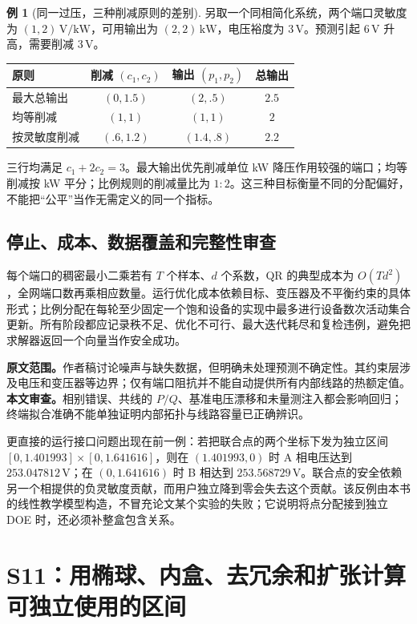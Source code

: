 \documentclass[UTF8,11pt,fontset=fandol,openany,oneside]{ctexbook}
\theoremstyle{definition}
\newtheorem{example}[theorem]{例}
\theoremstyle{remark}
\numberwithin{equation}{chapter}
\begin{document}
\begin{example}[同一过压，三种削减原则的差别]
另取一个同相简化系统，两个端口灵敏度为 $(1,2)\,\mathrm{V/kW}$，可用输出为 $(2,2)\,\mathrm{kW}$，电压裕度为 $3\,\mathrm V$。预测引起 $6\,\mathrm V$ 升高，需要削减 $3\,\mathrm V$。
\begin{center}
\begin{tabular}{@{}lccc@{}}
\toprule
原则 & 削减 $(c_1,c_2)$ & 输出 $(p_1,p_2)$ & 总输出 \\
\midrule
最大总输出 & $(0,1.5)$ & $(2,.5)$ & $2.5$ \\
均等削减 & $(1,1)$ & $(1,1)$ & $2$ \\
按灵敏度削减 & $(.6,1.2)$ & $(1.4,.8)$ & $2.2$ \\
\bottomrule
\end{tabular}
\end{center}
三行均满足 $c_1+2c_2=3$。最大输出优先削减单位 kW 降压作用较强的端口；均等削减按 kW 平分；比例规则的削减量比为 $1:2$。这三种目标衡量不同的分配偏好，不能把“公平”当作无需定义的同一个指标。
\end{example}

\subsection{停止、成本、数据覆盖和完整性审查}

每个端口的稠密最小二乘若有 $T$ 个样本、$d$ 个系数，QR 的典型成本为 $O(Td^2)$，全网端口数再乘相应数量。运行优化成本依赖目标、变压器及不平衡约束的具体形式；比例分配在每轮至少固定一个饱和设备的实现中最多进行设备数次活动集合更新。所有阶段都应记录秩不足、优化不可行、最大迭代耗尽和复检违例，避免把求解器返回一个向量当作安全成功。

\textbf{原文范围。}作者稿讨论噪声与缺失数据，但明确未处理预测不确定性。其约束层涉及电压和变压器等边界；仅有端口阻抗并不能自动提供所有内部线路的热额定值。\textbf{本文审查。}相别错误、共线的 $P/Q$、基准电压漂移和未量测注入都会影响回归；终端拟合准确不能单独证明内部拓扑与线路容量已正确辨识。

更直接的运行接口问题出现在前一例：若把联合点的两个坐标下发为独立区间
$[0,1.401993]\times[0,1.641616]$，则在 $(1.401993,0)$ 时 A 相电压达到
$253.047812\,\mathrm V$；在 $(0,1.641616)$ 时 B 相达到
$253.568729\,\mathrm V$。联合点的安全依赖另一个相提供的负灵敏度贡献，而用户独立降到零会失去这个贡献。该反例由本书的线性教学模型构造，不冒充论文某个实验的失败；它说明将点分配接到独立 DOE 时，还必须补整盒包含关系。

\section{S11：用椭球、内盒、去冗余和扩张计算可独立使用的区间}
\label{sec:oe_s11}
\end{document}
